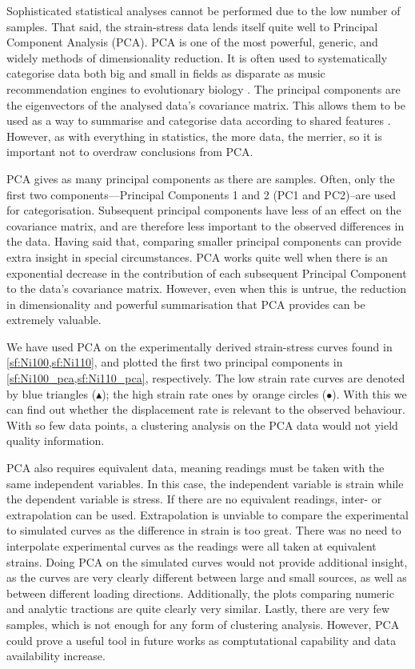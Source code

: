 Sophisticated statistical analyses cannot be performed due to the low number of samples. That said, the strain-stress data lends itself quite well to Principal Component Analysis (PCA). PCA is one of the most powerful, generic, and widely methods of dimensionality reduction. It is often used to systematically categorise data both big and small in fields as disparate as music recommendation engines to evolutionary biology \cite{pcamusic,pcaBio}. The principal components are the eigenvectors of the analysed data's covariance matrix. This allows them to be used as a way to summarise and categorise data according to shared features \cite{pca1}. However, as with everything in statistics, the more data, the merrier, so it is important not to overdraw conclusions from PCA.

PCA gives as many principal components as there are samples. Often, only the first two components---Principal Components 1 and 2 (PC1 and PC2)--are used for categorisation. Subsequent principal components have less of an effect on the covariance matrix, and are therefore less important to the observed differences in the data. Having said that, comparing smaller principal components can provide extra insight in special circumstances. PCA works quite well when there is an exponential decrease in the contribution of each subsequent Principal Component to the data's covariance matrix. However, even when this is untrue, the reduction in dimensionality and powerful summarisation that PCA provides can be extremely valuable.

We have used PCA on the experimentally derived strain-stress curves found in \cref{sf:Ni100,sf:Ni110}, and plotted the first two principal components in \cref{sf:Ni100_pca,sf:Ni110_pca}, respectively. The low strain rate curves are denoted by blue triangles (\textcolor{matlabBlue}{$\blacktriangle$}); the high strain rate ones by orange circles (\textcolor{matlabOrange}{$\bullet$}). With this we can find out whether the displacement rate is relevant to the observed behaviour. With so few data points, a clustering analysis on the PCA data would not yield quality information.

PCA also requires equivalent data, meaning readings must be taken with the same independent variables. In this case, the independent variable is strain while the dependent variable is stress. If there are no equivalent readings, inter- or extrapolation can be used. Extrapolation is unviable to compare the experimental to simulated curves as the difference in strain is too great. There was no need to interpolate experimental curves as the readings were all taken at equivalent strains. Doing PCA on the simulated curves would not provide additional insight, as the curves are very clearly different between large and small sources, as well as between different loading directions. Additionally, the plots comparing numeric and analytic tractions are quite clearly very similar. Lastly, there are very few samples, which is not enough for any form of clustering analysis. However, PCA could prove a useful tool in future works as comptutational capability and data availability increase.

